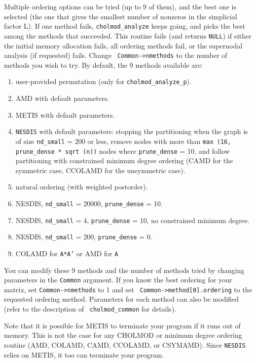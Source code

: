 \documentclass[11pt]{article}
\begin{document}
Multiple ordering options can be tried (up to 9 of them), and the best one is
selected (the one that gives the smallest number of nonzeros in the simplicial
factor L).  If one method fails, {\tt cholmod\_analyze} keeps going, and picks
the best among the methods that succeeded.  This routine fails (and returns
{\tt NULL}) if either the initial memory allocation fails, all ordering methods
fail, or the supernodal analysis (if requested) fails.  Change {\tt
Common->nmethods} to the number of methods you wish to try.  By default, the 9
methods available are:

\begin{enumerate}
\item user-provided permutation (only for {\tt cholmod\_analyze\_p}).
\item AMD with default parameters.
\item METIS with default parameters.
\item {\tt NESDIS} with default parameters: stopping the partitioning when
            the graph is of size {\tt nd\_small} = 200 or less, remove nodes
            with more than {\tt max (16, prune\_dense * sqrt (n))} nodes where
            {\tt prune\_dense} = 10, and follow partitioning with constrained
            minimum degree ordering (CAMD for the symmetric case, CCOLAMD for
            the unsymmetric case).
\item natural ordering (with weighted postorder).
\item NESDIS, {\tt nd\_small} = 20000, {\tt prune\_dense} = 10.
\item NESDIS, {\tt nd\_small} =     4, {\tt prune\_dense} = 10,
    no constrained minimum degree.
\item NESDIS, {\tt nd\_small} =   200, {\tt prune\_dense} = 0.
\item COLAMD for {\tt A*A'} or AMD for {\tt A}
\end{enumerate}

You can modify these 9 methods and the number of methods tried by changing
parameters in the {\tt Common} argument.  If you know the best ordering for
your matrix, set {\tt Common->nmethods} to 1 and set {\tt
Common->method[0].ordering} to the requested ordering method.  Parameters for
each method can also be modified (refer to the description of {\tt
cholmod\_common} for details).

Note that it is possible for METIS to terminate your program if it runs out of
memory.  This is not the case for any CHOLMOD or minimum degree ordering
routine (AMD, COLAMD, CAMD, CCOLAMD, or CSYMAMD).  Since {\tt NESDIS} relies on
METIS, it too can terminate your program.
\end{document}
